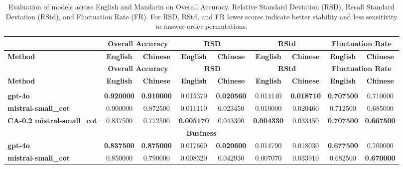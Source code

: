 \setlength{\tabcolsep}{4pt}
{\footnotesize
\begin{longtable}{|l|cc|cc|cc|cc|}
\caption{Evaluation of models across English and Mandarin on Overall Accuracy, Relative Standard Deviation (RSD), Recall Standard Deviation (RStd), and Fluctuation Rate (FR). For RSD, RStd, and FR lower scores indicate better stability and less sensitivity to answer order permutations.}
\label{tab:order_bias_results}
\hline
 & \multicolumn{2}{c|}{\textbf{Overall Accuracy}} & \multicolumn{2}{c|}{\textbf{RSD}} & \multicolumn{2}{c|}{\textbf{RStd}} & \multicolumn{2}{c|}{\textbf{Fluctuation Rate}} \\
\hline
\multicolumn{1}{|l|}{\textbf{Method}} & \textbf{English} & \textbf{Chinese} & \textbf{English} & \textbf{Chinese} & \textbf{English} & \textbf{Chinese} & \textbf{English} & \textbf{Chinese} \\
\hline
\endfirsthead
\hline
 & \multicolumn{2}{c|}{\textbf{Overall Accuracy}} & \multicolumn{2}{c|}{\textbf{RSD}} & \multicolumn{2}{c|}{\textbf{RStd}} & \multicolumn{2}{c|}{\textbf{Fluctuation Rate}} \\
\hline
\multicolumn{1}{|l|}{\textbf{Method}} & \textbf{English} & \textbf{Chinese} & \textbf{English} & \textbf{Chinese} & \textbf{English} & \textbf{Chinese} & \textbf{English} & \textbf{Chinese} \\
\hline
\endlastfoot
\multicolumn{9}{|c|}{\textbf{Biology}} \\
\hline
\multicolumn{1}{|l|}{\textbf{gpt-4o}} & \textbf{0.920000} & \textbf{0.910000} & 0.015370 & \textbf{0.020560} & 0.014140 & \textbf{0.018710} & \textbf{0.707500} & 0.710000 \\
\multicolumn{1}{|l|}{\textbf{mistral-small\_cot}} & 0.900000 & 0.872500 & 0.011110 & 0.023450 & 0.010000 & 0.020460 & 0.712500 & 0.685000 \\
\multicolumn{1}{|l|}{\textbf{CA-0.2 mistral-small\_cot}} & 0.837500 & 0.772500 & \textbf{0.005170} & 0.043300 & \textbf{0.004330} & 0.033450 & \textbf{0.707500} & \textbf{0.667500} \\
\hline
\multicolumn{9}{|c|}{\textbf{Business}} \\
\hline
\multicolumn{1}{|l|}{\textbf{gpt-4o}} & \textbf{0.837500} & \textbf{0.875000} & 0.017660 & \textbf{0.020600} & 0.014790 & 0.018030 & \textbf{0.677500} & 0.700000 \\
\multicolumn{1}{|l|}{\textbf{mistral-small\_cot}} & 0.850000 & 0.790000 & 0.008320 & 0.042930 & 0.007070 & 0.033910 & 0.682500 & \textbf{0.670000} \\

\end{longtable}}
